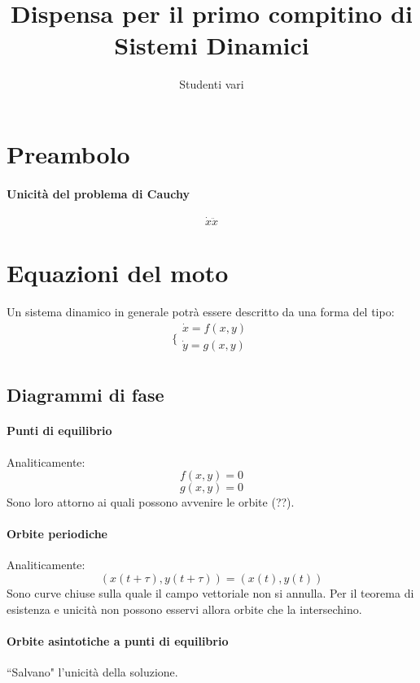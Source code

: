 \documentclass[a4paper,12pt]{article}
\begin{document}
\begin{titlepage}
\title{Dispensa per il primo compitino di Sistemi Dinamici}
\author{Studenti vari}
\maketitle
\end{titlepage}
\begin{titlepage}
\tableofcontents
\end{titlepage}

\section{Preambolo}
\paragraph{Unicità del problema di Cauchy}
$$\dot{x}\ddot{x}$$

\section{Equazioni del moto}

Un sistema dinamico in generale potrà essere descritto da una forma del tipo:
$$\bigg\{ \begin{array}{l}
\dot{x} = f(x, y)\\
\dot{y} = g(x, y)\\
\end{array}$$

\subsection{Diagrammi di fase}
\paragraph{Punti di equilibrio} Analiticamente:
$$f(x, y) = 0$$ $$g(x, y) = 0$$
Sono loro attorno ai quali possono avvenire le orbite (??).
\paragraph{Orbite periodiche}
Analiticamente:
$$ ( x(t+\tau), y(t+\tau) ) = (x(t), y(t))$$
Sono curve chiuse sulla quale il campo vettoriale non si annulla.
Per il teorema di esistenza e unicità non possono esservi allora orbite che la intersechino.
\paragraph{Orbite asintotiche a punti di equilibrio}
``Salvano" l'unicità della soluzione.
\end{document}
